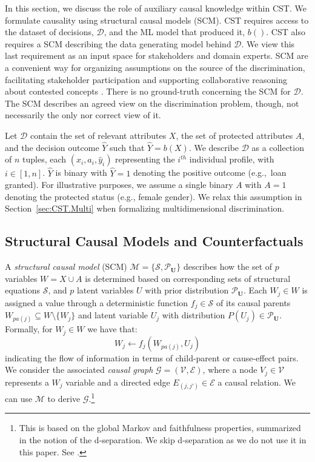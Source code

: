 %
In this section, we discuss the role of auxiliary causal knowledge within CST. 
We formulate causality using structural causal models (SCM). 
%
CST requires access to the dataset of decisions, $\mathcal{D}$, and the ML model that produced it, $b()$.
CST also requires a SCM describing the data generating model behind $\mathcal{D}$.
%
We view this last requirement as an input space for stakeholders and domain experts. 
SCM are a convenient way for organizing assumptions on the source of the discrimination, facilitating stakeholder participation and supporting collaborative reasoning about contested concepts \parencite{Mulligan2022_AFCP}. 
There is no ground-truth concerning the SCM for $\mathcal{D}$.
The SCM describes an agreed view on the discrimination problem, though, not necessarily the only nor correct view of it.

Let $\mathcal{D}$ contain the set of relevant attributes $X$, the set of protected attributes $A$, and the decision outcome $\hat{Y}$ such that $\hat{Y}=b(X)$. 
We describe $\mathcal{D}$ as a collection of $n$ tuples, each $(x_i, a_i, \widehat{y}_i)$ representing the $i^{th}$ individual profile, with $i \in [1, n]$. $\hat{Y}$ is binary with $\hat{Y} = 1$ denoting the positive outcome (e.g.,~loan granted). 
%
For illustrative purposes, we assume a single binary $A$ with $A=1$ denoting the protected status (e.g., female gender). 
We relax this assumption in Section~\ref{sec:CST.Multi} when formalizing multidimensional discrimination.
 
\subsection{Structural Causal Models and Counterfactuals}
\label{sec:CausalKnowledge.SCM}

A \textit{structural causal model} (SCM) \parencite{PearlCausality2009} $\mathcal{M}=\{ \mathcal{S}, \mathcal{P}_{\mathbf{U}} \}$ describes how the set of $p$ variables $W = X \cup A$ is determined based on corresponding sets of structural equations $\mathcal{S}$,
and $p$ latent variables $U$ with prior distribution $\mathcal{P}_{\mathbf{U}}$. Each $W_j \in W$ is assigned a value through a deterministic function $f_j \in \mathcal{S}$ of its causal parents $W_{pa(j)} \subseteq W \setminus \{ W_j \}$ and latent variable $U_j$ with distribution $P(U_j) \in \mathcal{P}_{\mathbf{U}}$. Formally, for $W_j \in W$ we have that: 
%
\begin{equation}
\label{eq:SCM}
    W_j \leftarrow f_j(W_{pa(j)}, U_j)
\end{equation}
%
indicating the flow of information in terms of child-parent or cause-effect pairs. We consider the associated \textit{causal graph} $\mathcal{G} = (\mathcal{V}, \mathcal{E})$, where a node $V_j \in \mathcal{V}$ represents a $W_j$ variable and a directed edge $E_{(j, j')} \in \mathcal{E}$ a causal relation.
We can use $\mathcal{M}$ to derive $\mathcal{G}$.\footnote{This is based on the global Markov and faithfulness properties, summarized in the notion of the d-separation. We skip d-separation as we do not use it in this paper. See \textcite{Peters2017_CausalInference}.}


